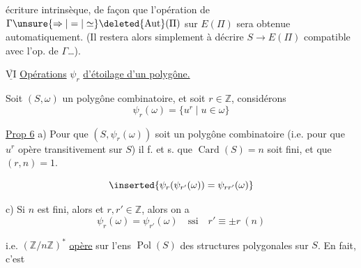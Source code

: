 écriture intrinsèque, de façon que l'opération de $\Gamma\unsure{\Rightarrow|=|\simeq}\deleted{\operatorname{Aut}}(\Pi)$ sur $E(\Pi)$ sera obtenue automatiquement. (Il restera alors simplement à décrire $S\longrightarrow E(\Pi)$ compatible avec l'op. de $\Gamma$\ldots).

$\overline{\underline{\mathrm{VI}}}$ \uline{Opérations} $\psi_r$ \uline{d'étoilage d'un polygône.}

Soit $(S,\omega)$ un polygône combinatoire, et soit $r\in\mathbb Z$, considérons
\[
\psi_r(\omega)=\{u^r\mid u\in\omega\}\tag*{(23)}
\]

\uline{Prop 6} a) Pour que  $(S,\psi_r(\omega))$ soit un polygône combinatoire (i.e. pour que $u^r$ opère transitivement sur $S$) il f. et s. que  $\operatorname{Card}(S)=n$ soit fini, et que $(r,n)=1$. 

\[
\inserted{\psi_r(\psi_{r'}(\omega))=\psi_{rr'}(\omega)}
\]

c) Si  $n$ est fini, alors   et  $r,r'\in\mathbb Z$,  alors on a
\[
\psi_r(\omega)=\psi_{r'}(\omega)\quad\text{ssi}\quad r'\equiv\pm r\ (n)
\]
    

i.e.  $(\mathbb Z/n\mathbb Z)^*$ \uline{opère} sur l'ens $\operatorname{Pol}(S)$ des structures polygonales sur $S$. En fait, c'est
